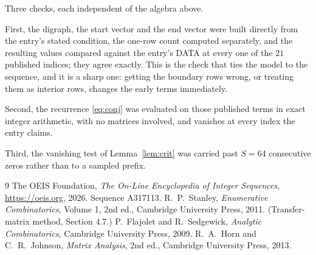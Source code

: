 \documentclass[11pt,a4paper]{article}
\theoremstyle{plain}
\theoremstyle{definition}
\begin{document}
Three checks, each independent of the algebra above.

First, the digraph, the start vector and the end vector were built directly from the
entry's stated condition, the one-row count computed separately, and the resulting values
compared against the entry's DATA at every one of the $21$ published indices; they
agree exactly. This is the check that ties the model to the sequence, and it is a sharp one:
getting the boundary rows wrong, or treating them as interior rows, changes the early terms
immediately.

Second, the recurrence \eqref{eq:conj} was evaluated on those published terms in exact
integer arithmetic, with no matrices involved, and vanishes at every index the entry claims.

Third, the vanishing test of Lemma~\ref{lem:crit} was carried past $S=64$ consecutive
zeros rather than to a sampled prefix.

\begin{thebibliography}{9}
 The OEIS Foundation, \emph{The On-Line Encyclopedia of Integer
Sequences}, \url{https://oeis.org}, 2026. Sequence A317113.
 R.~P.~Stanley, \emph{Enumerative Combinatorics}, Volume 1, 2nd ed.,
Cambridge University Press, 2011. (Transfer-matrix method, Section 4.7.)
 P.~Flajolet and R.~Sedgewick, \emph{Analytic Combinatorics}, Cambridge
University Press, 2009.
 R.~A.~Horn and C.~R.~Johnson, \emph{Matrix Analysis}, 2nd ed., Cambridge
University Press, 2013.
\end{thebibliography}
\end{document}
